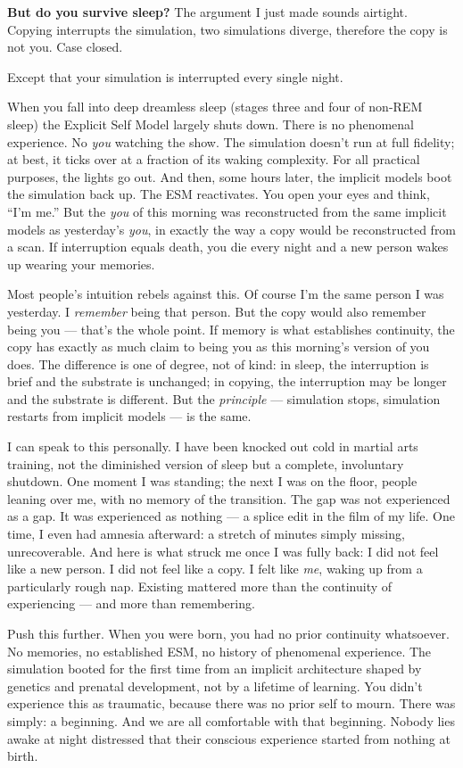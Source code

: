 \documentclass[11pt, twoside, openright]{book}
\begin{document}
\textbf{But do you survive sleep?} The argument I just made sounds airtight. Copying interrupts the simulation, two simulations diverge, therefore the copy is not you. Case closed.

Except that your simulation is interrupted every single night.

When you fall into deep dreamless sleep (stages three and four of non-REM sleep) the Explicit Self Model largely shuts down. There is no phenomenal experience. No \textit{you} watching the show. The simulation doesn't run at full fidelity; at best, it ticks over at a fraction of its waking complexity. For all practical purposes, the lights go out. And then, some hours later, the implicit models boot the simulation back up. The ESM reactivates. You open your eyes and think, ``I'm me.'' But the \textit{you} of this morning was reconstructed from the same implicit models as yesterday's \textit{you}, in exactly the way a copy would be reconstructed from a scan. If interruption equals death, you die every night and a new person wakes up wearing your memories.

Most people's intuition rebels against this. Of course I'm the same person I was yesterday. I \textit{remember} being that person. But the copy would also remember being you --- that's the whole point. If memory is what establishes continuity, the copy has exactly as much claim to being you as this morning's version of you does. The difference is one of degree, not of kind: in sleep, the interruption is brief and the substrate is unchanged; in copying, the interruption may be longer and the substrate is different. But the \textit{principle} --- simulation stops, simulation restarts from implicit models --- is the same.

I can speak to this personally. I have been knocked out cold in martial arts training, not the diminished version of sleep but a complete, involuntary shutdown. One moment I was standing; the next I was on the floor, people leaning over me, with no memory of the transition. The gap was not experienced as a gap. It was experienced as nothing --- a splice edit in the film of my life. One time, I even had amnesia afterward: a stretch of minutes simply missing, unrecoverable. And here is what struck me once I was fully back: I did not feel like a new person. I did not feel like a copy. I felt like \textit{me}, waking up from a particularly rough nap. Existing mattered more than the continuity of experiencing --- and more than remembering.

Push this further. When you were born, you had no prior continuity whatsoever. No memories, no established ESM, no history of phenomenal experience. The simulation booted for the first time from an implicit architecture shaped by genetics and prenatal development, not by a lifetime of learning. You didn't experience this as traumatic, because there was no prior self to mourn. There was simply: a beginning. And we are all comfortable with that beginning. Nobody lies awake at night distressed that their conscious experience started from nothing at birth.
\end{document}
